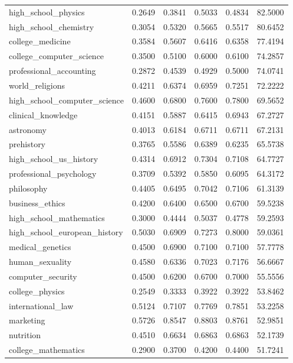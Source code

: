 \documentclass[]{bytedance_seed}
\newcommand{\1}{\mathbf{1}}
\begin{document}
{\begin{table}[htbp]
\begin{tabular}{lrrrrl}
high\_school\_physics & 0.2649 & 0.3841 & 0.5033 & 0.4834 & 82.5000 \\
high\_school\_chemistry & 0.3054 & 0.5320 & 0.5665 & 0.5517 & 80.6452 \\
college\_medicine & 0.3584 & 0.5607 & 0.6416 & 0.6358 & 77.4194 \\
college\_computer\_science & 0.3500 & 0.5100 & 0.6000 & 0.6100 & 74.2857 \\
professional\_accounting & 0.2872 & 0.4539 & 0.4929 & 0.5000 & 74.0741 \\
world\_religions & 0.4211 & 0.6374 & 0.6959 & 0.7251 & 72.2222 \\
high\_school\_computer\_science & 0.4600 & 0.6800 & 0.7600 & 0.7800 & 69.5652 \\
clinical\_knowledge & 0.4151 & 0.5887 & 0.6415 & 0.6943 & 67.2727 \\
astronomy & 0.4013 & 0.6184 & 0.6711 & 0.6711 & 67.2131 \\
prehistory & 0.3765 & 0.5586 & 0.6389 & 0.6235 & 65.5738 \\
high\_school\_us\_history & 0.4314 & 0.6912 & 0.7304 & 0.7108 & 64.7727 \\
professional\_psychology & 0.3709 & 0.5392 & 0.5850 & 0.6095 & 64.3172 \\
philosophy & 0.4405 & 0.6495 & 0.7042 & 0.7106 & 61.3139 \\
business\_ethics & 0.4200 & 0.6400 & 0.6500 & 0.6700 & 59.5238 \\
high\_school\_mathematics & 0.3000 & 0.4444 & 0.5037 & 0.4778 & 59.2593 \\
high\_school\_european\_history & 0.5030 & 0.6909 & 0.7273 & 0.8000 & 59.0361 \\
medical\_genetics & 0.4500 & 0.6900 & 0.7100 & 0.7100 & 57.7778 \\
human\_sexuality & 0.4580 & 0.6336 & 0.7023 & 0.7176 & 56.6667 \\
computer\_security & 0.4500 & 0.6200 & 0.6700 & 0.7000 & 55.5556 \\
college\_physics & 0.2549 & 0.3333 & 0.3922 & 0.3922 & 53.8462 \\
international\_law & 0.5124 & 0.7107 & 0.7769 & 0.7851 & 53.2258 \\
marketing & 0.5726 & 0.8547 & 0.8803 & 0.8761 & 52.9851 \\
nutrition & 0.4510 & 0.6634 & 0.6863 & 0.6863 & 52.1739 \\
college\_mathematics & 0.2900 & 0.3700 & 0.4200 & 0.4400 & 51.7241 \\

\end{tabular}
\end{table}}
\end{document}
